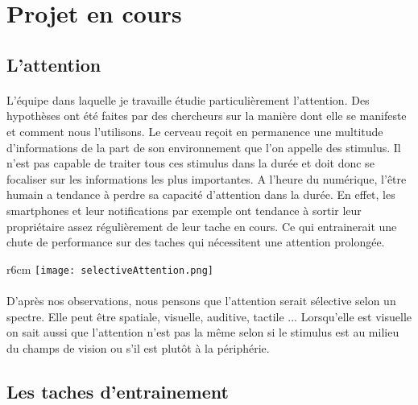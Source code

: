\section{Projet en cours}

\subsection{L'attention}

\paragraph{}L'équipe dans laquelle je travaille étudie particulièrement l'attention. Des hypothèses ont été faites par des chercheurs sur la manière dont elle se manifeste et comment nous
l'utilisons. Le cerveau reçoit en permanence une multitude d'informations de la part de son environnement que l'on appelle des stimulus. Il n'est pas capable de traiter tous ces
stimulus dans la durée et doit donc se focaliser sur les informations les plus importantes. A l'heure du numérique, l'être humain a tendance à perdre sa capacité d'attention dans la
durée. En effet, les smartphones et leur notifications par exemple ont tendance à sortir leur propriétaire assez régulièrement de leur tache en cours. Ce qui entrainerait une chute de
performance sur des taches qui nécessitent une attention prolongée.

\begin{wrapfigure}[10]{r}{6cm}
\texttt{[image: selectiveAttention.png]}
\end{wrapfigure}
\paragraph{}D'après nos observations, nous pensons que l'attention serait sélective selon un spectre. Elle peut être spatiale, visuelle, auditive, tactile ... Lorsqu'elle est visuelle
on sait aussi que l'attention n'est pas la même selon si le stimulus est au milieu du champs de vision ou s'il est plutôt à la périphérie.




\subsection{Les taches d'entrainement}



\newpage